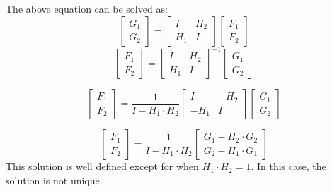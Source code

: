 \documentclass{article}
\begin{document}
\begin{enumerate}
    The above equation can be solved as:
    \[
        \begin{bmatrix}
            G_1 \\
            G_2
        \end{bmatrix}
        =
        \begin{bmatrix}
            I & H_2 \\
            H_1 & I
        \end{bmatrix}
        \begin{bmatrix}
            F_1 \\
            F_2
        \end{bmatrix}
    \]
    \[
        \begin{bmatrix}
            F_1 \\
            F_2
        \end{bmatrix}
        =
        \begin{bmatrix}
            I & H_2 \\
            H_1 & I
        \end{bmatrix}^{-1}
        \begin{bmatrix}
            G_1 \\
            G_2
        \end{bmatrix}
    \]
    
    \[
        \begin{bmatrix}
            F_1 \\
            F_2
        \end{bmatrix}
        =
        \frac{1}{I - H_1 \cdot H_2}
        \begin{bmatrix}
            I & -H_2 \\
            -H_1 & I
        \end{bmatrix}
        \begin{bmatrix}
            G_1 \\
            G_2
        \end{bmatrix}
    \]
    
    \[
        \begin{bmatrix}
            F_1 \\
            F_2
        \end{bmatrix}
        =
        \frac{1}{I - H_1 \cdot H_2}
        \begin{bmatrix}
            G_1 - H_2 \cdot G_2 \\
            G_2 - H_1 \cdot G_1
        \end{bmatrix}
    \]
    This solution is well defined except for when $H_1 \cdot H_2 = 1$. In this case, the solution is not unique. \\
    

\end{enumerate}
\end{document}
